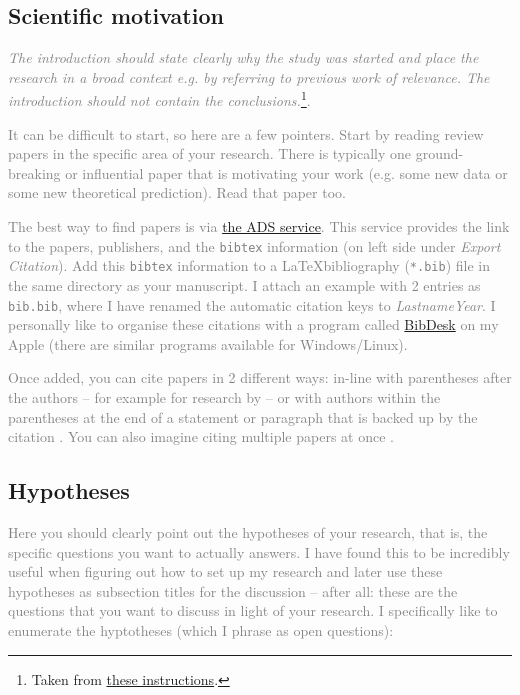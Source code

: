\documentclass[
  journal=pasa,
  manuscript=Research-Article,
  year=2025,
  volume=X,
]{cup-journal}
\newcommand{\comment}[1]{\textcolor{gray}{#1}}
\begin{document}
\subsection{Scientific motivation}

\comment{\textit{The introduction should state clearly why the study was started and place the research in a broad context e.g. by referring to previous work of relevance. The introduction should not contain the conclusions.}\footnote{Taken from \href{https://www.aanda.org/doc_journal/instructions/aadoc.pdf}{these instructions}.}.}

\comment{It can be difficult to start, so here are a few pointers. Start by reading review papers in the specific area of your research. There is typically one ground-breaking or influential paper that is motivating your work (e.g. some new data or some new theoretical prediction). Read that paper too.}

\comment{The best way to find papers is via \href{https://ui.adsabs.harvard.edu}{the ADS service}. This service provides the link to the papers, publishers, and the \texttt{bibtex} information (on left side under \textit{Export Citation}). Add this \texttt{bibtex} information to a \LaTeX bibliography (\texttt{*.bib}) file in the same directory as your manuscript. I attach an example with 2 entries as \texttt{bib.bib}, where I have renamed the automatic citation keys to \textit{LastnameYear}. I personally like to organise these citations with a program called \href{https://bibdesk.sourceforge.io}{BibDesk} on my Apple (there are similar programs available for Windows/Linux).}

\comment{Once added, you can cite papers in 2 different ways: in-line with parentheses after the authors -- for example for research by \citet{Buder2024b} -- or with authors within the parentheses at the end of a statement or paragraph that is backed up by the citation \citep{Buder2024b}. You can also imagine citing multiple papers at once \citep[e.g.][]{Buder2018, Buder2019, Buder2021, Buder2022, Buder2024b}.}

\subsection{Hypotheses} \label{sec:hypotheses}

\comment{Here you should clearly point out the hypotheses of your research, that is, the specific questions you want to actually answers. I have found this to be incredibly useful when figuring out how to set up my research and later use these hypotheses as subsection titles for the discussion -- after all: these are the questions that you want to discuss in light of your research. I specifically like to enumerate the hyptotheses (which I phrase as open questions):}
\end{document}
